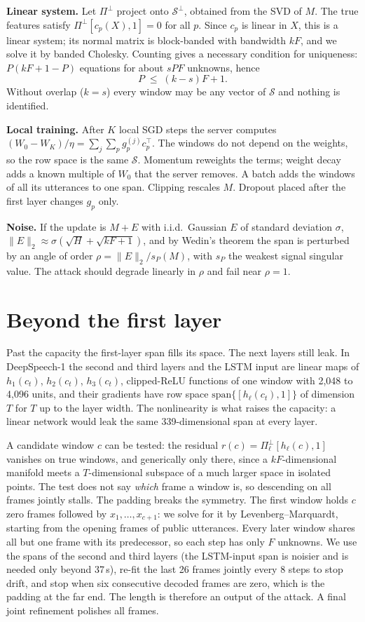 \documentclass[a4paper]{esannV2}
\begin{document}
\textbf{Linear system.} Let $\Pi^{\perp}$ project onto $\mathcal{S}^{\perp}$, obtained from the SVD of
$M$. The true features satisfy $\Pi^{\perp}[c_p(X),1]=0$ for all $p$. Since $c_p$ is linear in $X$, this
is a linear system; its normal matrix is block-banded with bandwidth $kF$, and we solve it by banded
Cholesky. Counting gives a necessary condition for uniqueness: $P(kF+1-P)$ equations for about $sPF$
unknowns, hence
\[
P\;\le\;(k-s)F+1 .
\]
Without overlap ($k=s$) every window may be any vector of $\mathcal{S}$ and nothing is identified.

\textbf{Local training.} After $K$ local SGD steps the server computes
$(W_0-W_K)/\eta=\sum_{j}\sum_p g_p^{(j)}c_p^{\top}$. The windows do not depend on the weights, so the row
space is the same $\mathcal{S}$. Momentum reweights the terms; weight decay adds a known multiple of
$W_0$ that the server removes. A batch adds the windows of all its utterances to one span. Clipping
rescales $M$. Dropout placed after the first layer changes $g_p$ only.

\textbf{Noise.} If the update is $M+E$ with i.i.d.\ Gaussian $E$ of standard deviation $\sigma$,
$\|E\|_2\approx\sigma(\sqrt{H}+\sqrt{kF+1})$, and by Wedin's theorem the span is perturbed by an angle
of order $\rho=\|E\|_2/s_P(M)$, with $s_P$ the weakest signal singular value. The attack should degrade
linearly in $\rho$ and fail near $\rho=1$.

\section{Beyond the first layer}

Past the capacity the first-layer span fills its space. The next layers still leak. In DeepSpeech-1
the second and third layers and the LSTM input are linear maps of $h_1(c_t)$, $h_2(c_t)$, $h_3(c_t)$,
clipped-ReLU functions of one window with 2{,}048 to 4{,}096 units, and their gradients have row space
$\mathrm{span}\{[h_\ell(c_t),1]\}$ of dimension $T$ for $T$ up to the layer width. The nonlinearity is
what raises the capacity: a linear network would leak the same 339-dimensional span at every layer.

A candidate window $c$ can be tested: the residual $r(c)=\Pi_\ell^{\perp}[h_\ell(c),1]$ vanishes on true
windows, and generically only there, since a $kF$-dimensional manifold meets a $T$-dimensional subspace
of a much larger space in isolated points. The test does not say \emph{which} frame a window is, so
descending on all frames jointly stalls. The padding breaks the symmetry. The first window holds $c$ zero
frames followed by $x_1,\dots,x_{c+1}$: we solve for it by Levenberg--Marquardt, starting from the opening
frames of public utterances. Every later window shares all but one frame with its predecessor, so each
step has only $F$ unknowns. We use the spans of the second and third layers (the LSTM-input span is noisier and is needed only beyond 37\,s), re-fit the last 26 frames jointly every 8 steps to stop drift, and stop
when six consecutive decoded frames are zero, which is the padding at the far end. The length is
therefore an output of the attack. A final joint refinement polishes all frames.
\end{document}
